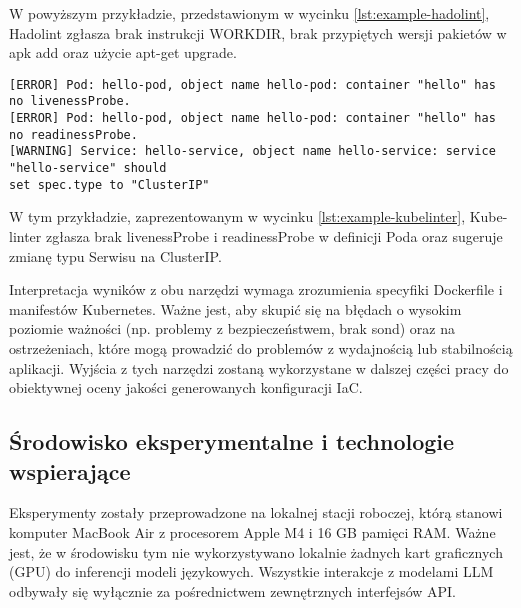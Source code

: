 W powyższym przykładzie, przedstawionym w wycinku \ref{lst:example-hadolint}, Hadolint zgłasza brak instrukcji WORKDIR, brak przypiętych wersji pakietów w apk add oraz użycie apt-get upgrade.

\begin{lstlisting}[caption={Przykład wyników Kube-linter},label={lst:example-kubelinter},captionpos=b,columns=fullflexible, breaklines=true]
[ERROR] Pod: hello-pod, object name hello-pod: container "hello" has no livenessProbe.
[ERROR] Pod: hello-pod, object name hello-pod: container "hello" has no readinessProbe.
[WARNING] Service: hello-service, object name hello-service: service "hello-service" should
set spec.type to "ClusterIP"
\end{lstlisting}

W tym przykładzie, zaprezentowanym w wycinku \ref{lst:example-kubelinter}, Kube-linter zgłasza brak livenessProbe i readinessProbe w definicji Poda oraz sugeruje zmianę typu Serwisu na ClusterIP.

Interpretacja wyników z obu narzędzi wymaga zrozumienia specyfiki Dockerfile i manifestów Kubernetes. Ważne jest, aby skupić się na błędach o wysokim poziomie ważności (np. problemy z bezpieczeństwem, brak sond) oraz na ostrzeżeniach, które mogą prowadzić do problemów z wydajnością lub stabilnością aplikacji. Wyjścia z tych narzędzi zostaną wykorzystane w dalszej części pracy do obiektywnej oceny jakości generowanych konfiguracji IaC.

\subsection{Środowisko eksperymentalne i technologie wspierające}

Eksperymenty zostały przeprowadzone na lokalnej stacji roboczej, którą stanowi komputer MacBook Air z procesorem Apple M4 i 16 GB pamięci RAM. Ważne jest, że w środowisku tym nie wykorzystywano lokalnie żadnych kart graficznych (GPU) do inferencji modeli językowych. Wszystkie interakcje z modelami LLM odbywały się wyłącznie za pośrednictwem zewnętrznych interfejsów API.

